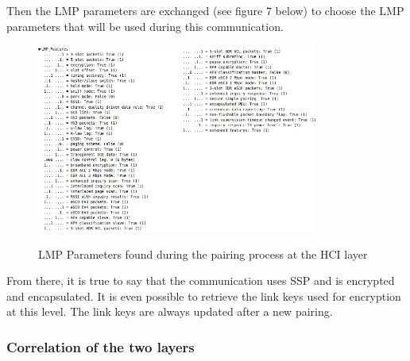 Then the LMP parameters are exchanged (see figure 7 below) to choose the LMP parameters that will be used during this communication. 
\begin{figure}[!h]
  \begin{center}
	\includegraphics[width=350px]{images/LMP_PARAM.jpg}
	\label{fig:lmp}
	\caption{LMP Parameters found during the pairing process at the HCI layer}
  \end{center}
\end{figure}

From there, it is true to say that the communication uses SSP and is encrypted and encapsulated. It is even possible to retrieve the link keys used for encryption at this level. The link keys are always updated after a new pairing.
\newpage
\subsubsection{Correlation of the two layers}

